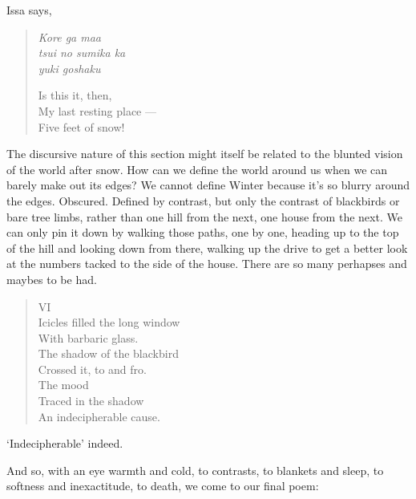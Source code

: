 \documentclass[12pt,oneside]{memoir}
\begin{document}
Issa says,

\begin{verse}
\emph{Kore ga maa} \\
\emph{tsui no sumika ka} \\
\emph{yuki goshaku}

Is this it, then, \\
My last resting place --- \\
Five feet of snow!

\parencite[37]{issa}
\end{verse}

The discursive nature of this section might itself be related to the blunted vision of the world after snow. How can we define the world around us when we can barely make out its edges? We cannot define Winter because it's so blurry around the edges. Obscured. Defined by contrast, but only the contrast of blackbirds or bare tree limbs, rather than one hill from the next, one house from the next. We can only pin it down by walking those paths, one by one, heading up to the top of the hill and looking down from there, walking up the drive to get a better look at the numbers tacked to the side of the house. There are so many perhapses and maybes to be had.

\begin{verse}

VI \\
Icicles filled the long window \\
With barbaric glass. \\
The shadow of the blackbird \\
Crossed it, to and fro. \\
The mood \\
Traced in the shadow \\
An indecipherable cause.

\parencite{blackbird}
\end{verse}

`Indecipherable' indeed.

And so, with an eye warmth and cold, to contrasts, to blankets and sleep, to softness and inexactitude, to death, we come to our final poem:
\end{document}
